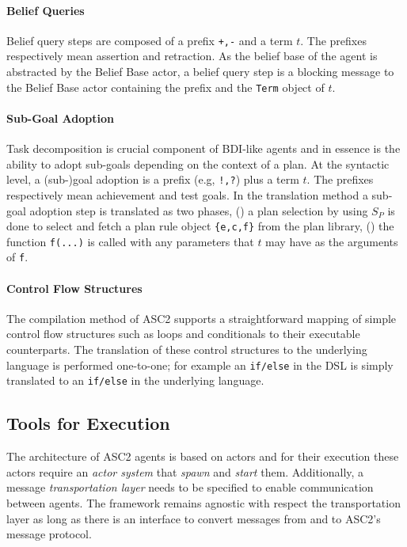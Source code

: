 \paragraph{Belief Queries}
Belief query steps are composed of a prefix \verb|+,-| and a term $t$. The prefixes respectively mean assertion and retraction. As the belief base of the agent is abstracted by the Belief Base actor, a belief query step is a blocking message to the Belief Base actor containing the prefix and the \verb+Term+ object of $t$.

\paragraph{Sub-Goal Adoption}
Task decomposition is crucial component of BDI-like agents and in essence is the ability to adopt sub-goals depending on the context of a plan. At the syntactic level, a (sub-)goal adoption is a prefix (e.g, \verb+!,?+) plus a term $t$. The prefixes respectively mean achievement and test goals. In the translation method a sub-goal adoption step is translated as two phases, () a plan selection by using $S_P$ is done to select and fetch a plan rule object \verb+{e,c,f}+ from the plan library, () the function \verb+f(...)+ is called with any parameters that $t$ may have as the arguments of \verb+f+.

\paragraph{Control Flow Structures}
The compilation method of ASC2 supports a  straightforward mapping of simple control flow structures such as loops and conditionals to their executable counterparts. The translation of these control structures to the underlying language is performed one-to-one; for example an \verb+if/else+ in the DSL is simply translated to an \verb+if/else+ in the underlying language.

\subsection{Tools for Execution}
The architecture of ASC2 agents is based on actors and for their execution these actors require an \textit{actor system} that \textit{spawn} and \textit{start} them. Additionally, a message \textit{transportation layer} needs to be specified to enable communication between agents. The framework remains agnostic with respect the transportation layer as long as there is an interface to convert messages from and to ASC2's message protocol.

